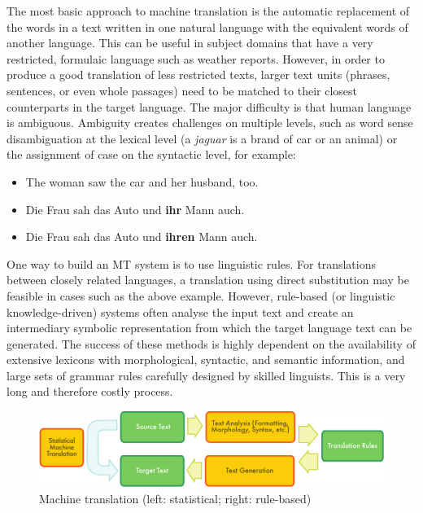\begin{multicols}{2}

The most basic approach to machine translation is the automatic replacement of the words in a text written in one natural language with the equivalent words of another language. This can be useful in subject domains that have a very restricted, formulaic language such as weather reports.  However, in order to produce a good translation of less restricted texts, larger text units (phrases, sentences, or even whole passages) need to be matched to their closest counterparts in the target language. The major difficulty is that human language is ambiguous. Ambiguity creates challenges on multiple levels, such as word sense disambiguation at the lexical level (a \textit{jaguar} is a brand of car or an animal) or the assignment of case on the syntactic level, for example:

\begin{itemize}
\item[] The woman saw the car and her husband, too.
\item Die Frau sah das Auto und \textbf{ihr} Mann auch.
\item Die Frau sah das Auto und \textbf{ihren} Mann auch.
\end{itemize}

One way to build an MT system is to use linguistic rules. For translations between closely related languages, a translation using direct substitution may be feasible in cases such as the above example. However, rule-based (or linguistic knowledge-driven) systems often analyse the input text and create an intermediary symbolic representation from which the target language text can be generated. The success of these methods is highly dependent on the availability of extensive lexicons with morphological, syntactic, and semantic information, and large sets of grammar rules carefully designed by skilled linguists. This is a very long and therefore costly process.

\begin{figure}[htb]
  \center
  \includegraphics[width=\textwidth]{../_media/english/machine_translation}
  \caption{Machine translation (left: statistical; right: rule-based)}
  \label{fig:mtarch_en}
\end{figure}
 

\end{multicols}
